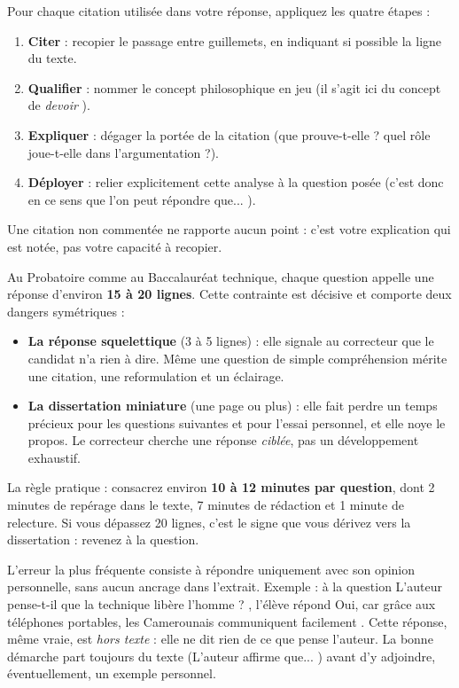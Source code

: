 \documentclass[11pt]{article}
\newcounter{popsec}
\newcounter{popsub}
\newcommand{\courssub}[1]{%
  \stepcounter{popsub}%
  \par\vspace{9pt}\noindent{\popxbold\fontsize{11.5}{13}\selectfont\color{popink}{\color{poporange}\thepopsec.\thepopsub}\hspace{6pt}#1}\par\nopagebreak\vspace{4pt}
}
\begin{document}
\begin{methode}
Pour chaque citation utilisée dans votre réponse, appliquez les quatre étapes :
\begin{enumerate}
\item \textbf{Citer} : recopier le passage entre guillemets, en indiquant si possible la ligne du texte.
\item \textbf{Qualifier} : nommer le concept philosophique en jeu (\og il s'agit ici du concept de \emph{devoir} \fg{}).
\item \textbf{Expliquer} : dégager la portée de la citation (que prouve-t-elle ? quel rôle joue-t-elle dans l'argumentation ?).
\item \textbf{Déployer} : relier explicitement cette analyse à la question posée (\og c'est donc en ce sens que l'on peut répondre que... \fg{}).
\end{enumerate}
Une citation non commentée ne rapporte aucun point : c'est votre explication qui est notée, pas votre capacité à recopier.
\end{methode}

\courssub{Gestion de l'espace et du temps}

Au Probatoire comme au Baccalauréat technique, chaque question appelle une réponse d'environ \textbf{15 à 20 lignes}. Cette contrainte est décisive et comporte deux dangers symétriques :

\begin{itemize}
\item \textbf{La réponse squelettique} (3 à 5 lignes) : elle signale au correcteur que le candidat n'a rien à dire. Même une question de simple compréhension mérite une citation, une reformulation et un éclairage.
\item \textbf{La dissertation miniature} (une page ou plus) : elle fait perdre un temps précieux pour les questions suivantes et pour l'essai personnel, et elle noye le propos. Le correcteur cherche une réponse \emph{ciblée}, pas un développement exhaustif.
\end{itemize}

La règle pratique : consacrez environ \textbf{10 à 12 minutes par question}, dont 2 minutes de repérage dans le texte, 7 minutes de rédaction et 1 minute de relecture. Si vous dépassez 20 lignes, c'est le signe que vous dérivez vers la dissertation : revenez à la question.

\begin{attention}
L'erreur la plus fréquente consiste à répondre uniquement avec son opinion personnelle, sans aucun ancrage dans l'extrait. Exemple : à la question \og L'auteur pense-t-il que la technique libère l'homme ? \fg{}, l'élève répond \og Oui, car grâce aux téléphones portables, les Camerounais communiquent facilement \fg{}. Cette réponse, même vraie, est \emph{hors texte} : elle ne dit rien de ce que pense l'auteur. La bonne démarche part toujours du texte (\og L'auteur affirme que... \fg{}) avant d'y adjoindre, éventuellement, un exemple personnel.
\end{attention}
\end{document}

